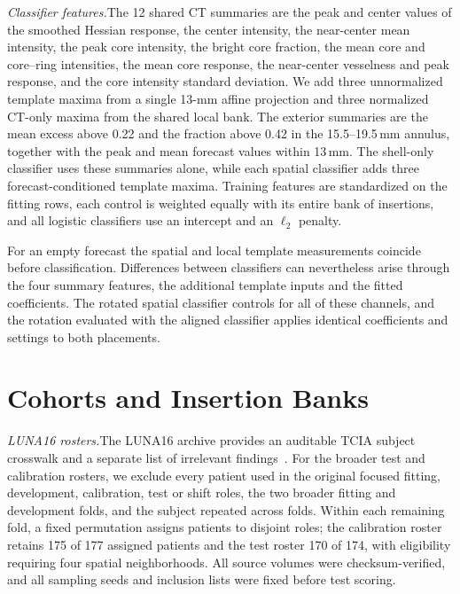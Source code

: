 \smallskip\noindent\textit{Classifier features.}\enspace The 12 shared CT summaries are the peak and center values of the smoothed Hessian response, the center intensity, the near-center mean intensity, the peak core intensity, the bright core fraction, the mean core and core--ring intensities, the mean core response, the near-center vesselness and peak response, and the core intensity standard deviation. We add three unnormalized template maxima from a single 13-mm affine projection and three normalized CT-only maxima from the shared local bank. The exterior summaries are the mean excess above 0.22 and the fraction above 0.42 in the 15.5--19.5\,mm annulus, together with the peak and mean forecast values within 13\,mm. The shell-only classifier uses these summaries alone, while each spatial classifier adds three forecast-conditioned template maxima. Training features are standardized on the fitting rows, each control is weighted equally with its entire bank of insertions, and all logistic classifiers use an intercept and an $\ell_2$ penalty.

For an empty forecast the spatial and local template measurements coincide before classification. Differences between classifiers can nevertheless arise through the four summary features, the additional template inputs and the fitted coefficients. The rotated spatial classifier controls for all of these channels, and the rotation evaluated with the aligned classifier applies identical coefficients and settings to both placements.

\section{Cohorts and Insertion Banks}
\label{supp:cohort}
\begin{table}[t]
\centering
\caption{Cohort roles; blocks are LUNA16 patients or HiPaS scans, and each control is paired with 18 insertions.}
\label{tab:roles}

\end{table}

\smallskip\noindent\textit{LUNA16 rosters.}\enspace The LUNA16 archive provides an auditable TCIA subject crosswalk and a separate list of irrelevant findings~\cite{setio2017,armato2011}. For the broader test and calibration rosters, we exclude every patient used in the original focused fitting, development, calibration, test or shift roles, the two broader fitting and development folds, and the subject repeated across folds. Within each remaining fold, a fixed permutation assigns patients to disjoint roles; the calibration roster retains 175 of 177 assigned patients and the test roster 170 of 174, with eligibility requiring four spatial neighborhoods. All source volumes were checksum-verified, and all sampling seeds and inclusion lists were fixed before test scoring.

